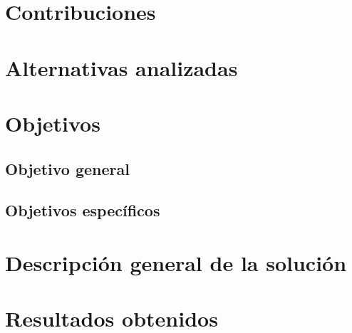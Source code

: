 \section{Contribuciones}
\label{sec-1.3}

\section{Alternativas analizadas}
\label{sec-1.4}

\section{Objetivos}
\label{sec-1.5}

\subsection{Objetivo general}
\label{sec-1.5.1}

\subsection{Objetivos específicos}
\label{sec-1.5.2}

\section{Descripción general de la solución}
\label{sec-1.6}

\section{Resultados obtenidos}
\label{sec-1.7}


\begin{comment}
\lipsum[30-35]
\begin{enumerate}
	\item Item 1
	\begin{enumerate}
		\item Subitem 1
		\item Subitem 2 (ver Figura \ref{logofcfm})
	\end{enumerate}
	\item Item 2
	\item Item 3
\end{enumerate}
\begin{teo}
Se tiene que $$\int_0^t e^sds=e^t-1.$$
\end{teo}
\lipsum[36-40]
\end{comment}